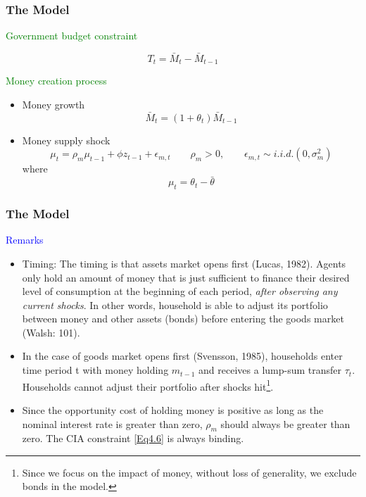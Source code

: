 \documentclass[handout]{beamer}
\begin{document}
\begin{frame}
\frametitle{The Model} \vskip 0.1in

\textcolor{green}{Government budget constraint}

\begin{equation}\label{Eq4.7}
T_{t}=\bar{M}_{t} - \bar{M}_{t-1}
\end{equation}

\textcolor{green}{Money creation process}
\begin{itemize}
\item Money growth
\begin{equation}\label{Eq4.8}
\bar{M}_{t}=(1+\theta_{t})\bar{M}_{t-1}
\end{equation}

\pause

\item Money supply shock
\begin{equation}\label{Eq4.9}
\mu_{t}=\rho_{m}\mu_{t-1} + \phi z_{t-1} +\epsilon_{m,t} \qquad
\rho_{m}>0, \qquad \epsilon_{m,t} \sim i.i.d.(0,\sigma_{m}^{2})
\end{equation}
where
\begin{equation}\label{Eq4.10}
\mu_{t}=\theta_{t}-\bar{\theta}
\end{equation}

\end{itemize}


\end{frame}

\begin{frame}
\frametitle{The Model} \vskip 0.1in

\textcolor{blue}{Remarks}

\begin{itemize}
\item Timing: The timing is that assets market opens first (Lucas,
1982). Agents only hold an amount of money that is just sufficient
to finance their desired level of consumption at the beginning of
each period, \emph{after observing any current shocks}. In other
words, household is able to adjust its portfolio between money and
other assets (bonds) before entering the goods market (Walsh: 101).

\item In the case of goods market opens first (Svensson, 1985), households enter time
period t with money holding $m_{t-1}$ and receives a lump-sum
transfer $\tau_{t}$. Households cannot adjust their portfolio after
shocks hit\footnote{Since we focus on the impact of money, without loss of generality, we exclude bonds in the model.}.


\item Since the opportunity cost of holding money
is positive as long as the nominal interest rate is greater than
zero, $\rho_{m}$ should always be greater than zero. The CIA
constraint \eqref{Eq4.6} is always binding.


\end{itemize}




\end{frame}
\end{document}
